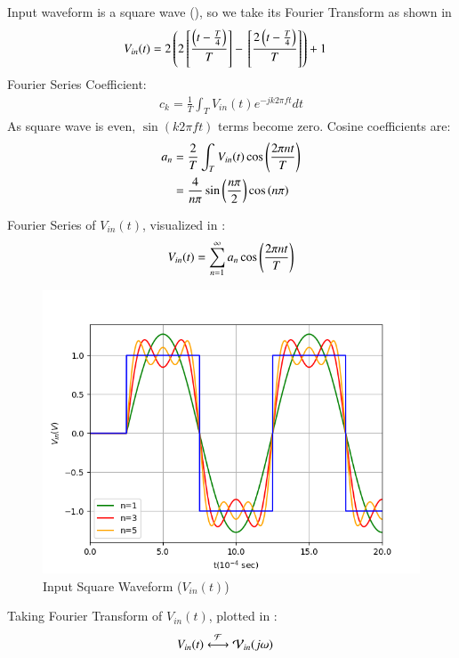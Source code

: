 \documentclass[journal,12pt,twocolumn]{IEEEtran}
\theoremstyle{remark}
\begin{document}
\solution


Input waveform is a square wave (), so we take its Fourier Transform as shown in 
\begin{align}
    V_{in}(t) &= 2\left(2{}\left[\frac{\left(t-\frac{T}{4}\right)}{T}\right] - {}\left[\frac{2\left(t - \frac{T}{4}\right)}{T}\right]\right) + 1
\end{align}
Fourier Series Coefficient:
\begin{align}
    c_k = \frac{1}{T} \int_{T} V_{in}(t)e^{-jk2\pi ft}dt
\end{align}
As square wave is even, $\sin(k2\pi ft)$ terms become zero. Cosine coefficients are:
\begin{align}
    a_n &= \frac{2}{T} \int_{T} V_{in}(t) \cos\left(\frac{2\pi nt}{T}\right)\\
    &= \frac{4}{n\pi}\sin{\ensuremath{\left(\frac{n\pi}{2}\right)}}\cos\left({n\pi}\right)
\end{align}

Fourier Series of $V_{in}(t)$, visualized in :
\begin{align}
    V_{in}(t) = \sum_{n = 1}^{\infty}a_n \cos\left(\frac{2\pi nt}{T}\right)
\end{align}

\begin{figure}[!h]
    \centering
    \includegraphics[width = \columnwidth]{figs/f_s.png}
    \caption{Input Square Waveform ($V_{in}(t)$)}
    \label{fig:square_gate.ph.23.37}
\end{figure}

Taking Fourier Transform of $V_{in}(t)$, plotted in :
\begin{align}
    V_{in}(t) &\system{F} \mathcal{V}_{in}(j\omega)
\end{align}
\end{document}
